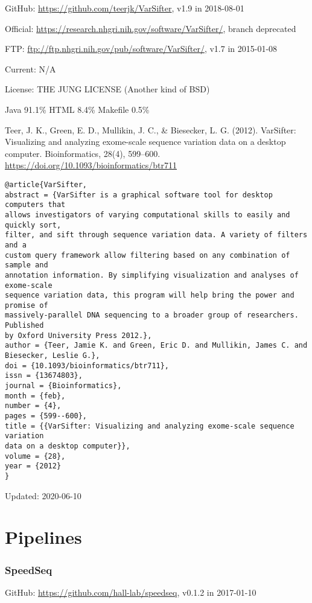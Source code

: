 \documentclass[]{article}
\begin{document}
GitHub: \url{https://github.com/teerjk/VarSifter}, v1.9 in 2018-08-01

Official: \url{https://research.nhgri.nih.gov/software/VarSifter/}, branch deprecated

FTP: \url{ftp://ftp.nhgri.nih.gov/pub/software/VarSifter/}, v1.7 in 2015-01-08

Current: N/A

License: THE JUNG LICENSE (Another kind of BSD)

Java 91.1\% HTML 8.4\% Makefile 0.5\%

Teer, J. K., Green, E. D., Mullikin, J. C., \& Biesecker, L. G. (2012). VarSifter: Visualizing and analyzing exome-scale sequence variation data on a desktop computer. Bioinformatics, 28(4), 599–600. \url{https://doi.org/10.1093/bioinformatics/btr711}

\begin{verbatim}
@article{VarSifter,
abstract = {VarSifter is a graphical software tool for desktop computers that
allows investigators of varying computational skills to easily and quickly sort,
filter, and sift through sequence variation data. A variety of filters and a
custom query framework allow filtering based on any combination of sample and
annotation information. By simplifying visualization and analyses of exome-scale
sequence variation data, this program will help bring the power and promise of
massively-parallel DNA sequencing to a broader group of researchers. Published
by Oxford University Press 2012.},
author = {Teer, Jamie K. and Green, Eric D. and Mullikin, James C. and
Biesecker, Leslie G.},
doi = {10.1093/bioinformatics/btr711},
issn = {13674803},
journal = {Bioinformatics},
month = {feb},
number = {4},
pages = {599--600},
title = {{VarSifter: Visualizing and analyzing exome-scale sequence variation
data on a desktop computer}},
volume = {28},
year = {2012}
}
\end{verbatim}

Updated: 2020-06-10



\part{Pipelines}
\section{SpeedSeq}

GitHub: \url{https://github.com/hall-lab/speedseq}, v0.1.2 in 2017-01-10
\end{document}
